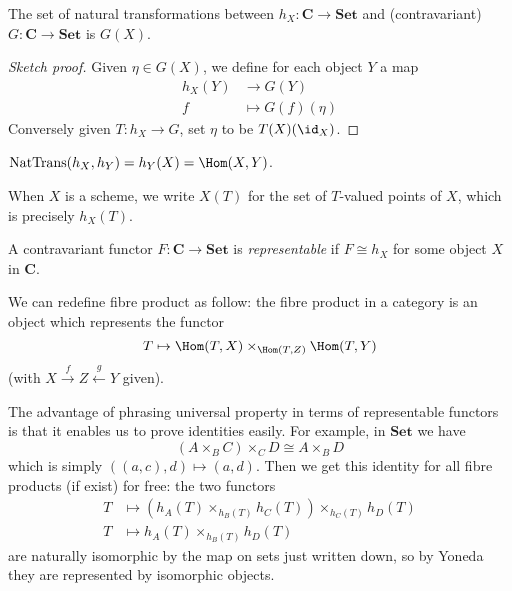 \documentclass[a4paper]{article}
\renewcommand{\c}[1]{\mathbf{#1}} %
\begin{document}
\begin{theorem}
  The set of natural transformations between \(h_X: \c C \to \c{Set}\) and (contravariant) \(G: \c C \to \c{Set}\) is \(G(X)\).
\end{theorem}

\begin{proof}[Sketch proof]
  Given \(\eta \in G(X)\), we define for each object \(Y\) a map
  \begin{align*}
    h_X(Y) &\to G(Y) \\
    f &\mapsto G(f)(\eta)
  \end{align*}
  Conversely given \(T: h_X \to G\), set \(\eta\) to be \(T(X)(\id_X)\).
\end{proof}

\begin{corollary}
  \(\operatorname{NatTrans}(h_X, h_Y) = h_Y(X) = \Hom(X, Y)\).
\end{corollary}

\begin{remark}
  When \(X\) is a scheme, we write \(X(T)\) for the set of \(T\)-valued points of \(X\), which is precisely \(h_X(T)\).
\end{remark}

\begin{definition}
  A contravariant functor \(F: \c C \to \c{Set}\) is \emph{representable} if \(F \cong h_X\) for some object \(X\) in \(\c C\).
\end{definition}

We can redefine fibre product as follow: the fibre product in a category is an object which represents the functor
\[
  T \mapsto \Hom(T, X) \times_{\Hom(T, Z)} \Hom(T, Y)
\]
(with \(X \xrightarrow{f} Z \xleftarrow{g} Y\) given).

The advantage of phrasing universal property in terms of representable functors is that it enables us to prove identities easily. For example, in \(\c{Set}\) we have
\[
  (A \times_B C) \times_C D \cong A \times_B D
\]
which is simply \(((a, c), d) \mapsto (a, d)\). Then we get this identity for all fibre products (if exist) for free: the two functors
\begin{align*}
  T &\mapsto (h_A(T) \times_{h_B(T)} h_C(T)) \times_{h_C(T)} h_D(T) \\
  T &\mapsto h_A(T) \times_{h_B(T)} h_D(T)
\end{align*}
are naturally isomorphic by the map on sets just written down, so by Yoneda they are represented by isomorphic objects.
\end{document}
